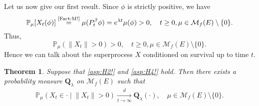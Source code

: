 \documentclass[12pt,a4paper]{amsart}
\numberwithin{equation}{section}
\theoremstyle{plain}
\newtheorem{thm}{Theorem}[section]
\theoremstyle{definition}
\theoremstyle{remark}
\begin{document}
	Let us now give our first result. Since $\phi$ is strictly positive, we have
\begin{equation}
	\mathbb P_\mu[X_t(\phi)]
	\overset{\text{\eqref{Fact:M!}}}= \mu(P_t^\beta \phi)
	=e^{\lambda t}\mu(\phi)>0, \quad t\geq 0, \mu \in \mathcal M_f(E)\setminus\{0\}.
\end{equation}
	Thus,
\begin{equation}  \label{lem:Nd!}
		\mathbb P_\mu(\|X_t\| > 0) > 0,\quad t\geq 0,\mu \in \mathcal M_f(E)\setminus \{0\}.
\end{equation}
	Hence we can talk about the superprocess $X$ conditioned on survival up to time $t$.
\begin{thm} \label{Theorem:Y:H1:H2:H3:H4}
	Suppose that \eqref{asp:H2!} and \eqref{asp:H4!} hold. 
	Then there exists a probability measure $\mathbf Q_\lambda$ on $\mathcal M_f(E)$ such that
\begin{align}
 	\mathbb P_\mu \left(X_t \in \cdot \middle| \|X_t\| > 0 \right)
 	\xrightarrow[t\to \infty]{d} \mathbf Q_\lambda(\cdot),
 	\quad \mu \in \mathcal M_f(E)\setminus \{0\}.
\end{align}
\end{thm}
\end{document}
